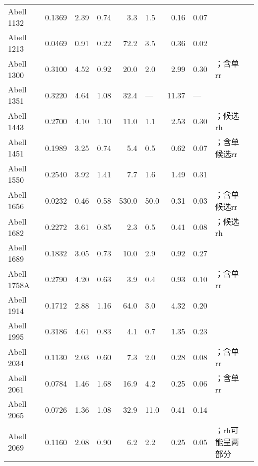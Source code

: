 \begin{ThreePartTable}
\begin{longtable}{lcccr@{$\,\pm\,$}lr@{$\,\pm\,$}lll}
Abell 1132           & 0.1369 & 2.39 & 0.74 &   3.3 &  1.5 &  0.16 &  0.07 & \parencite{wilber2018}  \\
Abell 1213           & 0.0469 & 0.91 & 0.22 &  72.2 &  3.5 &  0.36 &  0.02 & \parencite{giovannini2009}  \\
Abell 1300           & 0.3100 & 4.52 & 0.92 &  20.0 &  2.0 &  2.99 &  0.30 & \parencite{reid1999}；含单\acl{rr}  \\
Abell 1351           & 0.3220 & 4.64 & 1.08 &  32.4 &  --- & 11.37 &  ---  & \parencite{giacintucci2011b}  \\
Abell 1443           & 0.2700 & 4.10 & 1.10 &  11.0 &  1.1\tnote{b} &  2.53 &  0.30 & \parencite{bonafede2015}；候选\acl{rh}  \\
Abell 1451           & 0.1989 & 3.25 & 0.74 &   5.4 &  0.5 &  0.62 &  0.07 & \parencite{cuciti2018}；含单候选\acl{rr}  \\
Abell 1550           & 0.2540 & 3.92 & 1.41 &   7.7 &  1.6 &  1.49 &  0.31 & \parencite{govoni2012}  \\
Abell 1656           & 0.0232 & 0.46 & 0.58 & 530.0 & 50.0 &  0.31 &  0.03 & \parencite{kim1990}；含单候选\acl{rr}  \\
Abell 1682           & 0.2272 & 3.61 & 0.85 &   2.3 &  0.5\tnote{c} &  0.41 &  0.08 & \parencite{macario2013}；候选\acl{rh}  \\
Abell 1689           & 0.1832 & 3.05 & 0.73 &  10.0 &  2.9 &  0.92 &  0.27 & \parencite{vacca2011}  \\
Abell 1758A          & 0.2790 & 4.20 & 0.63 &   3.9 &  0.4 &  0.93 &  0.10 & \parencite{giovannini2009}；含单\acl{rr}  \\
Abell 1914           & 0.1712 & 2.88 & 1.16 &  64.0 &  3.0 &  4.32 &  0.20 & \parencite{bacchi2003}  \\
Abell 1995           & 0.3186 & 4.61 & 0.83 &   4.1 &  0.7 &  1.35 &  0.23 & \parencite{giovannini2009}  \\
Abell 2034           & 0.1130 & 2.03 & 0.60 &   7.3 &  2.0 &  0.28 &  0.08 & \parencite{vanWeeren2011}；含单\acl{rr}  \\
Abell 2061           & 0.0784 & 1.46 & 1.68 &  16.9 &  4.2 &  0.25 &  0.06 & \parencite{farnsworth2013}；含单\acl{rr}  \\
Abell 2065           & 0.0726 & 1.36 & 1.08 &  32.9 & 11.0 &  0.41 &  0.14 & \parencite{farnsworth2013}  \\
Abell 2069           & 0.1160 & 2.08 & 0.90 &   6.2 &  2.2\tnote{d} &  0.25 &  0.05 & \parencite{drabent2015}；\acl{rh}可能呈两部分  \\

\end{longtable}
\end{ThreePartTable}
